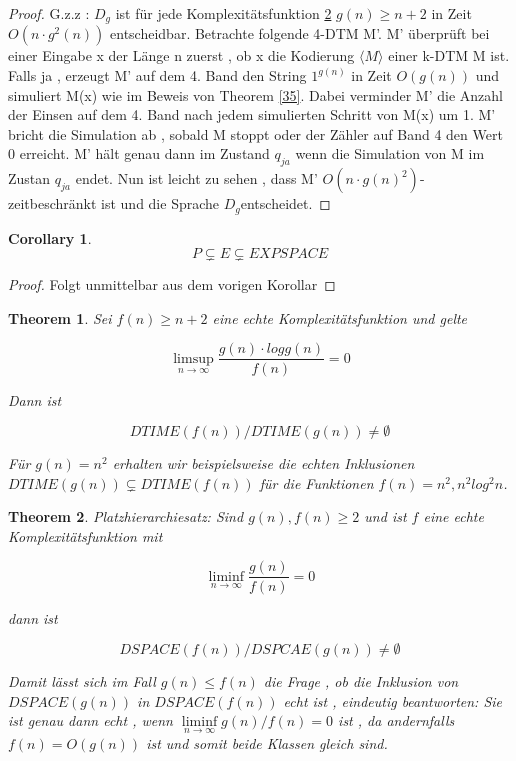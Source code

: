 \documentclass{article}
\newtheorem{theorem}{Theorem}
\newtheorem{corollary}{Corollary}[theorem]
\begin{document}
	\begin{proof}
		G.z.z : $D_g$ ist für jede Komplexitätsfunktion \ref{complexity_function} $g(n) \geq n+2 $ in Zeit $O(n \cdot g^2(n))$ entscheidbar. Betrachte folgende 4-DTM M'. M' überprüft bei einer Eingabe x der Länge n zuerst , ob x die Kodierung $\langle M \rangle $ einer k-DTM M ist. Falls ja , erzeugt M' auf dem 4. Band den String $1^{g(n)}$  in Zeit $O(g(n))$ und simuliert M(x) wie im Beweis von Theorem \ref{35}. Dabei verminder M' die Anzahl der Einsen auf dem 4. Band nach jedem simulierten Schritt von M(x) um 1. M' bricht die Simulation ab , sobald M stoppt oder der Zähler auf Band 4 den Wert 0 erreicht. M' hält genau dann im Zustand $q_{ja}$ wenn die Simulation von M im Zustan $q_{ja}$ endet. Nun ist leicht zu sehen , dass M' $O(n\cdot g(n)^2)$-zeitbeschränkt ist und die Sprache $D_g $entscheidet. 	
	\end{proof}

	\begin{corollary}
		\[
		 	P \subsetneq E \subsetneq EXPSPACE
		\]
	\end{corollary}

	\begin{proof}
		Folgt unmittelbar aus dem vorigen Korollar
	\end{proof}

	\begin{theorem}
		Sei $f(n) \geq n+2$ eine echte Komplexitätsfunktion und gelte

		\[
			\limsup\limits_{n\rightarrow\infty} \frac{g(n) \cdot log g(n)}{f(n)} = 0 
		\]

		Dann ist

		\[
			DTIME(f(n)) / DTIME(g(n)) \neq \emptyset
		\]

		Für $g(n)=n^2$ erhalten wir beispielsweise die echten Inklusionen $DTIME(g(n)) \subsetneq DTIME(f(n))$ für die Funktionen $f(n)=n^2 , n^2log^2n$.
	\end{theorem}

	\begin{theorem}{Platzhierarchiesatz}: Sind $g(n),f(n) \geq 2$ und ist $f$ eine echte Komplexitätsfunktion \label{complexity_function} mit

		\[ 
			\liminf\limits_{n \rightarrow \infty} \frac{g(n)}{f(n)} = 0
		\]

		dann ist 

		\[
			DSPACE(f(n))/DSPCAE(g(n)) \neq \emptyset
		\]

		Damit lässt sich im Fall $g(n) \leq f(n) $ die Frage , ob die Inklusion von $DSPACE(g(n))$ in $DSPACE(f(n))$ echt ist , eindeutig beantworten: Sie ist genau dann echt , wenn $\liminf\limits_{n \rightarrow \infty} g(n)/f(n) = 0  $ ist , da andernfalls $f(n) = O(g(n)) $ ist und somit beide Klassen gleich sind. 
	\end{theorem}
\end{document}
